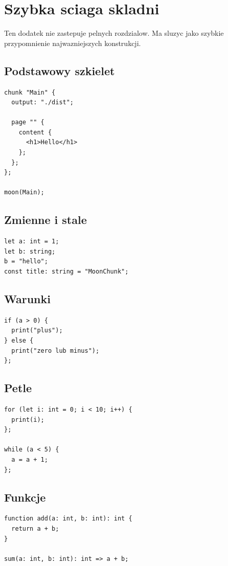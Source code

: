\chapter{Szybka sciaga skladni}

Ten dodatek nie zastepuje pelnych rozdzialow. Ma sluzyc jako szybkie przypomnienie
najwazniejszych konstrukcji.

\section{Podstawowy szkielet}
\begin{lstlisting}[style=moonchunk]
chunk "Main" {
  output: "./dist";

  page "" {
    content {
      <h1>Hello</h1>
    };
  };
};

moon(Main);
\end{lstlisting}

\section{Zmienne i stale}
\begin{lstlisting}[style=moonchunk]
let a: int = 1;
let b: string;
b = "hello";
const title: string = "MoonChunk";
\end{lstlisting}

\section{Warunki}
\begin{lstlisting}[style=moonchunk]
if (a > 0) {
  print("plus");
} else {
  print("zero lub minus");
};
\end{lstlisting}

\section{Petle}
\begin{lstlisting}[style=moonchunk]
for (let i: int = 0; i < 10; i++) {
  print(i);
};

while (a < 5) {
  a = a + 1;
};
\end{lstlisting}

\section{Funkcje}
\begin{lstlisting}[style=moonchunk]
function add(a: int, b: int): int {
  return a + b;
}

sum(a: int, b: int): int => a + b;
\end{lstlisting}

